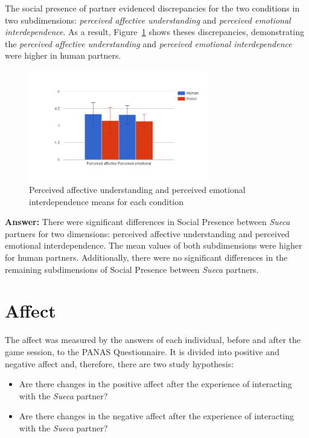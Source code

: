 The social presence of partner evidenced discrepancies for the two conditions in two subdimensions: \emph{perceived affective understanding} and \emph{perceived emotional interdependence}.
As a result, Figure~\ref{fig:perceiveEmoAff} shows theses discrepancies, demonstrating the \emph{perceived affective understanding} and \emph{perceived emotional interdependence} were higher in human partners.

\begin{figure}[H]
  \centering
    \includegraphics[width=0.7\textwidth]{./img/7/perceiveEmoAff}
  \caption{Perceived affective understanding and perceived emotional interdependence means for each  condition}
\label{fig:perceiveEmoAff}
\end{figure}

\textbf{Answer:} There were significant differences in Social Presence between \emph{Sueca} partners for two dimensions: perceived affective understanding and perceived emotional interdependence.
The mean values of both subdimensions were higher for human partners.
Additionally, there were no significant differences in the remaining subdimensions of Social Presence between \emph{Sueca} partners.


\section{Affect}
\label{sec:affect}
The affect was measured by the answers of each individual, before and after the game session, to the PANAS Questionnaire.
It is divided into positive and negative affect and, therefore, there are two study hypothesis:
\begin{itemize}
\item Are there changes in the positive affect after the experience of interacting with the \emph{Sueca} partner?
\item Are there changes in the negative affect after the experience of interacting with the \emph{Sueca} partner?
\end{itemize}

